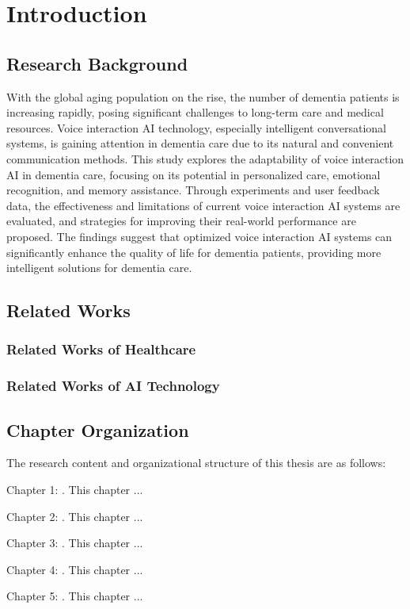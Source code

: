 \chapter{Introduction}
\label{c:01_introduction}

\section{Research Background}

With the global aging population on the rise, the number of dementia patients is increasing rapidly, posing significant challenges to long-term care and medical resources. Voice interaction AI technology, especially intelligent conversational systems, is gaining attention in dementia care due to its natural and convenient communication methods. This study explores the adaptability of voice interaction AI in dementia care, focusing on its potential in personalized care, emotional recognition, and memory assistance. Through experiments and user feedback data, the effectiveness and limitations of current voice interaction AI systems are evaluated, and strategies for improving their real-world performance are proposed. The findings suggest that optimized voice interaction AI systems can significantly enhance the quality of life for dementia patients, providing more intelligent solutions for dementia care. \cite{hochr1997longshort, kapla2020scalingla}


\section{Related Works}

\subsection{Related Works of Healthcare}

\subsection{Related Works of AI Technology}




\section{Chapter Organization}
The research content and organizational structure of this thesis are as follows:

Chapter 1: . This chapter ...

Chapter 2: . This chapter ...

Chapter 3: . This chapter ...

Chapter 4: . This chapter ...

Chapter 5: . This chapter ...





